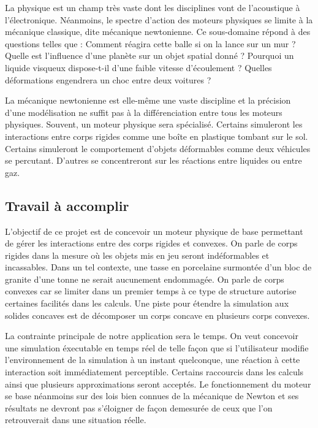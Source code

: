 La physique est un champ très vaste dont les disciplines vont de
l'acoustique à l'électronique. Néanmoins, le spectre d'action des
moteurs physiques se limite à la mécanique classique, dite mécanique
newtonienne. Ce sous-domaine répond à des questions telles que :
Comment réagira cette balle si on la lance sur un mur ? Quelle est
l'influence d'une planète sur un objet spatial donné ? Pourquoi un
liquide visqueux dispose-t-il d'une faible vitesse d'écoulement ?
Quelles déformations engendrera un choc entre deux voitures ?

La mécanique newtonienne est elle-même une vaste discipline et la
précision d'une modélisation ne suffit pas à la différenciation entre
tous les moteurs physiques. Souvent, un moteur physique sera
spécialisé. Certains simuleront les interactions entre corps rigides
comme une boîte en plastique tombant sur le sol. Certains simuleront
le comportement d'objets déformables comme deux véhicules se
percutant. D'autres se concentreront sur les réactions entre liquides
ou entre gaz.

\subsection{Travail à accomplir}

L'objectif de ce projet est de concevoir un moteur physique de base
permettant de gérer les interactions entre des corps rigides et
convexes. On parle de corps rigides dans la mesure o\`u les objets mis
en jeu seront indéformables et incassables. Dans un tel contexte, une
tasse en porcelaine surmontée d'un bloc de granite d'une tonne ne
serait aucunement endommagée. On parle de corps convexes car se
limiter dans un premier temps à ce type de structure autorise
certaines facilités dans les calculs. Une piste pour étendre la
simulation aux solides concaves est de décomposer un corps concave en
plusieurs corps convexes.

La contrainte principale de notre application sera le temps. On veut
concevoir une simulation éxecutable en temps réel de telle façon que
si l'utilisateur modifie l'environnement de la simulation à un instant
quelconque, une réaction à cette interaction soit immédiatement
perceptible. Certains raccourcis dans les calculs ainsi que plusieurs
approximations seront acceptés. Le fonctionnement du moteur se base
néanmoins sur des lois bien connues de la mécanique de Newton et ses
résultats ne devront pas s'éloigner de façon demesurée de ceux que
l'on retrouverait dans une situation réelle.

